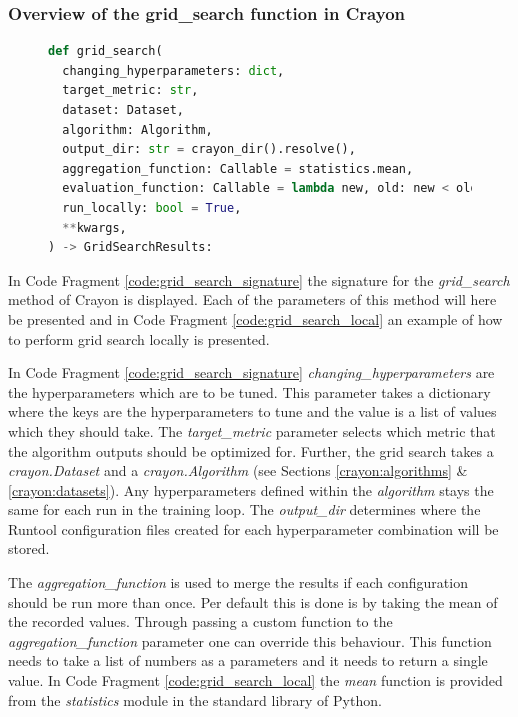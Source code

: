 \subsubsection{Overview of the grid\_search function in Crayon}
\begin{figure}
  \begin{lstlisting}[language=Python, label={code:grid_search_signature}, caption={Parameters of the grid search functionality in Crayon.}]
def grid_search(
  changing_hyperparameters: dict,
  target_metric: str,
  dataset: Dataset,
  algorithm: Algorithm,
  output_dir: str = crayon_dir().resolve(),
  aggregation_function: Callable = statistics.mean,
  evaluation_function: Callable = lambda new, old: new < old,
  run_locally: bool = True,
  **kwargs,
) -> GridSearchResults:
    \end{lstlisting}
\end{figure}
In Code Fragment \ref{code:grid_search_signature} the signature for the \textit{grid\_search} method of Crayon is displayed. Each of the parameters of this method will here be presented and in Code Fragment \ref{code:grid_search_local} an example of how to perform grid search locally is presented.

In Code Fragment \ref{code:grid_search_signature} \textit{changing\_hyperparameters} are the hyperparameters which are to be tuned. This parameter takes a dictionary where the keys are the hyperparameters to tune and the value is a list of values which they should take. The \textit{target\_metric} parameter selects which metric that the algorithm outputs should be optimized for. Further, the grid search takes a \textit{crayon.Dataset} and a \textit{crayon.Algorithm} (see Sections \ref{crayon:algorithms} \& \ref{crayon:datasets}). Any hyperparameters defined within the \textit{algorithm} stays the same for each run in the training loop. The \textit{output\_dir} determines where the Runtool configuration files created for each hyperparameter combination will be stored.

The \textit{aggregation\_function} is used to merge the results if each configuration should be run more than once. Per default this is done is by taking the mean of the recorded values. Through passing a custom function to the \textit{aggregation\_function} parameter one can override this behaviour. This function needs to take a list of numbers as a parameters and it needs to return a single value. In Code Fragment \ref{code:grid_search_local} the \textit{mean} function is provided from the \textit{statistics} module in the standard library of Python.

